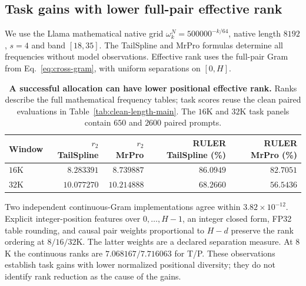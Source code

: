 \subsection{Task gains with lower full-pair effective rank}
\label{sec:allocation-rank-quality}
We use the Llama mathematical native grid
$\omega_k^N=500000^{-k/64}$, native length $8192$, $s=4$ and band $[18,35]$.
The TailSpline and MrPro formulas determine all frequencies without model
observations. Effective rank uses the full-pair Gram from
Eq.~\eqref{eq:cross-gram}, with uniform separations on $[0,H]$.

\begin{table}[ht]
\centering\small
\caption{\textbf{A successful allocation can have lower positional effective rank.}
Ranks describe the full mathematical frequency tables; task scores reuse
the clean paired evaluations in Table~\ref{tab:clean-length-main}.
The $16$K and $32$K task panels contain $650$ and $2600$ paired prompts.}
\label{tab:allocation-rank-quality}
\begin{tabular}{@{}lrrrr@{}}
\toprule
Window & $r_2$ TailSpline & $r_2$ MrPro & RULER TailSpline (\%) & RULER MrPro (\%)\\
\midrule
$16$K & $8.283391$ & $8.739887$ & $86.0949$ & $82.7051$\\
$32$K & $10.077270$ & $10.214888$ & $68.2660$ & $56.5436$\\
\bottomrule
\end{tabular}
\end{table}

Two independent continuous-Gram implementations agree within
$3.82\times10^{-12}$. Explicit integer-position features over
$0,\ldots,H-1$, an integer closed form, FP32 table rounding, and causal
pair weights proportional to $H-d$ preserve the rank ordering at
$8/16/32$K. The latter weights are a declared separation measure.
At $8$K the continuous ranks are $7.068167/7.716063$ for T/P.
These observations establish task gains with lower normalized positional
diversity; they do not identify rank reduction as the cause of the gains.

